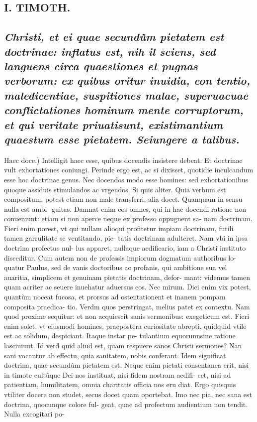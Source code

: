 \documentclass{article}
\begin{document}
\begin{pages}
\section*{I. TIMOTH. }
\marginpar{[ p.74 ]}
{}
\subsection*{\textit{Christi, et ei quae secundû̀m pietatem est doctrinae: inflatus est, nih il sciens, sed languens circa quaestiones et pugnas verborum: ex quibus oritur inuidia, con tentio, maledicentiae, suspitiones malae, superuacuae conflictationes hominum mente corruptorum, et qui veritate priuatisunt, existimantium quaestum esse pietatem. Seiungere a talibus. }}\pstart Haec doce.) Intelligit haec esse, quibus docendis insistere debeat. Et doctrinae vult exhortationes coniungi. Perinde ergo est, ac si dixisset, quotidie inculcandum esse hoc doctrinae genus. Nec docendos modo esse homines: sed exhortationibus quoque assiduis stimulandos ac vrgendos.  \pend\pstart Si quis aliter. Quia verbum est compositum, potest etiam non male transferri, alia docet. Quanquam in sensu nulla est ambi- guitas. Damnat enim eos omnes, qui in hac docendi ratione non conueniunt: etiam si non aperce neque ex professo oppugnent sa- nam doctrinam. Fieri enim porest, vt qui nullam alioqui profitetur impiam doctrinam, futili tamen garrulitate se ventitando, pie- tatis doctrinam adulteret. Nam vbi in ipsa doctrina profectus nul- lus apparet, nullaque aedificario, iam a Christi instituto disceditur. Cum autem non de professis impiorum dogmatum authoribus lo- quatur Paulus, sed de vanis doctoribus ac profanis, qui ambitione sua vel auaritia, simplicem et genuinam pietatis doctrinam, defor- mant: videmus tamen quam acriter ac seuere inuehatur aduersus eos. Nec mirum. Dici enim vix potest, quantùm noceat fucosa, et prorsus ad ostentationent et inanem pompam composita praedica- tio. Verdm quos perstringat, melius patet ex contextu. Nam quod proxime sequitur: et non acquiescit sanis sermonibus: exegeticum est. Fieri enim solet, vt eiusmodi homines, praepostera curiositate abrepti, quidquid vtile est ac solidum, despiciant. Itaque instar pe- tulantium equorunnsine ratione lasciuiunt. Id verd̀ quid aliud est, quam respuere sanos Christi sermones? Nan sani vocantur ab effectu, quia sanitatem, nobis conferant. Idem significat doctrina, quae secundùm pietatem est. Neque enim pietati consentanea erit, nisi in timote cultûque Dei nos instituat, nisi fidem nostram aedifi- cet, nisi ad patientiam, humilitatem, omnia charitatis officia nos eru diat. Ergo quisquis vtiliter docere non studet, secus docet quam oportebat. Imo nec pia, nec sana est doctrina, quocunque colore ful- geat, quae ad profectum audientium non tendit. Nulla excogitari po-  \pend

\end{pages}
\end{document}
